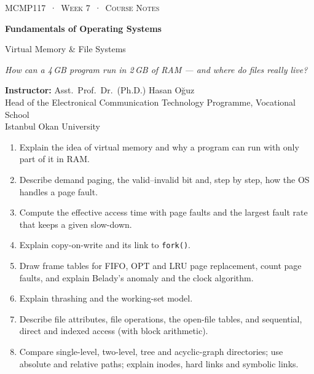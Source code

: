 \documentclass[11pt,a4paper]{article}
\newcommand{\cmd}[1]{\texttt{#1}}
\begin{document}
\thispagestyle{empty}
\begin{tcolorbox}[enhanced,colback=dark,colframe=dark,arc=0pt,boxrule=0pt,
  left=18pt,right=18pt,top=20pt,bottom=20pt,coltext=white]
{\small\color{mint}\textsc{MCMP117 \,·\, Week 7 \,·\, Course Notes}}\par\medskip
{\headfont\fontsize{26}{30}\selectfont\bfseries Fundamentals of Operating Systems}\par\medskip
{\large Virtual Memory \& File Systems}\par\smallskip
{\small\itshape\color{white!70} How can a 4\,GB program run in 2\,GB of RAM --- and where do files really live?}
\end{tcolorbox}

\vspace{0.4em}
{\small
\textbf{Instructor:} Asst.\ Prof.\ Dr.\ (Ph.D.) Hasan Oğuz\\
Head of the Electronical Communication Technology Programme, Vocational School\\
Istanbul Okan University\par}

\vspace{0.8em}
\begin{keyidea}
\begin{enumerate}[leftmargin=1.4em]
  \item Explain the idea of virtual memory and why a program can run with only part of it in RAM.
  \item Describe demand paging, the valid--invalid bit and, step by step, how the OS handles a page fault.
  \item Compute the effective access time with page faults and the largest fault rate that keeps a given slow-down.
  \item Explain copy-on-write and its link to \cmd{fork()}.
  \item Draw frame tables for FIFO, OPT and LRU page replacement, count page faults, and explain Belady's anomaly and the clock algorithm.
  \item Explain thrashing and the working-set model.
  \item Describe file attributes, file operations, the open-file tables, and sequential, direct and indexed access (with block arithmetic).
  \item Compare single-level, two-level, tree and acyclic-graph directories; use absolute and relative paths; explain inodes, hard links and symbolic links.
\end{enumerate}
\end{keyidea}
\end{document}

